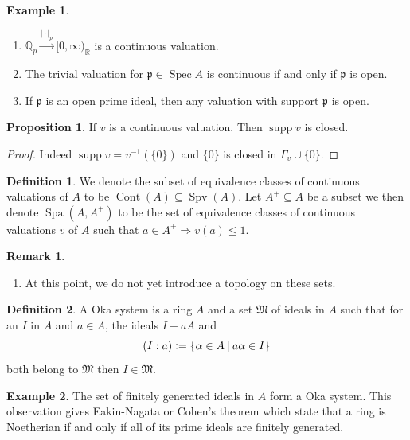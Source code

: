 \documentclass[10pt]{article}
\numberwithin{equation}{section}
\theoremstyle{definition}
\newtheorem{proposition}{Proposition}[subsection]
\newtheorem{definition}{Definition}[subsection]
\newtheorem{remark}{Remark}[subsection]
\newtheorem{example}{Example}[subsection]
\DeclareMathOperator{\supp}{supp}
\DeclareMathOperator{\Spec}{Spec}
\DeclareMathOperator{\Spa}{Spa}
\DeclareMathOperator{\Spv}{Spv}
\DeclareMathOperator{\Cont}{Cont}
\newcommand{\defeq}{\vcentcolon=}
\newcommand{\R}[0]{\mathbb{R}}
\newcommand{\Q}[0]{\mathbb{Q}}
\newcommand{\sep}[0]{\:|\:}
\newcommand{\p}[0]{\mathfrak{p}}
\newcommand{\ab}[1]{\vert #1 \vert}
\begin{document}
\begin{example}$\:$
    \label{example_12_1}
    \begin{enumerate}
        \item $\Q_p\stackrel{\ab{\cdot}_p}{\to}[0,\infty)_\R$ is a continuous valuation.
        \item The trivial valuation for $\p\in\Spec A$ is continuous if and only if $\p$ is open.
        \item If $\p$ is an open prime ideal, then any valuation with support $\p$ is open.
    \end{enumerate}
\end{example}
\begin{proposition}
    \label{fact_12_2}
    If $v$ is a continuous valuation. Then $\supp v$ is closed.
\end{proposition}
\begin{proof}
    Indeed $\supp v = v^{-1}(\{0\})$ and $\{0\}$ is closed in $\Gamma_v\cup\{0\}$.
\end{proof}
\begin{definition}
    \label{definition_12_2}
    We denote the subset of equivalence classes of continuous valuations of $A$ to be $\Cont(A)\subseteq\Spv(A)$.
    Let $A^+\subseteq A$ be a subset we then denote $\Spa(A,A^+)$ to be the set of equivalence classes of continuous valuations $v$ of $A$ such that $a\in A^+\Rightarrow v(a)\leq 1$.
\end{definition}
\begin{remark}$\:$
    \begin{enumerate}
        \item At this point, we do not yet introduce a topology on these sets.
    \end{enumerate}
\end{remark}
\begin{definition}
    \label{definition_12_3}
    A Oka system is a ring $A$ and a set $\mathfrak{M}$ of ideals in $A$ such that for an $I$ in $A$ and $a\in A$, the ideals $I+aA$ and
    \begin{equation*}
        (I:a) \defeq \{\alpha\in A\sep a\alpha\in I\}
    \end{equation*}
    both belong to $\mathfrak{M}$ then $I\in\mathfrak{M}$.
\end{definition}
\begin{example}
    \label{example_12_2}
    The set of finitely generated ideals in $A$ form a Oka system. This observation gives Eakin-Nagata or Cohen's theorem which state that a ring is Noetherian if and only if all of its prime ideals are finitely generated.
\end{example}
\end{document}
